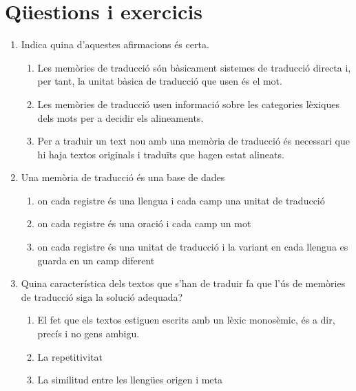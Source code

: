 \section{Qüestions i exercicis}

\begin{enumerate}
\item Indica quina d'aquestes afirmacions és certa.
\begin{enumerate}
\item Les memòries de traducció són bàsicament sistemes de
     traducció directa i, per tant, la unitat bàsica de traducció que
     usen és el mot.
\item Les memòries de traducció usen informació sobre les
     categories lèxiques dels mots per a decidir els alineaments.
\item Per a traduir un text nou amb una memòria de traducció
     és necessari que hi haja textos
     originals i traduïts que hagen estat alineats.
\end{enumerate}

\item Una memòria de traducció és una base de dades 
   
\begin{enumerate}
\item on cada registre és una llengua i cada camp una unitat de
      traducció
\item on cada registre és una oració i cada camp un mot
\item on cada registre és una unitat de traducció i la variant en
      cada llengua es guarda en un camp diferent
\end{enumerate}
\item Quina característica dels textos que s'han de traduir fa que
   l'ús de memòries de traducció siga la solució adequada?
   
\begin{enumerate}
\item El fet que els textos estiguen escrits amb un lèxic
      monosèmic, és a dir, precís i no gens ambigu.
\item La repetitivitat
\item La similitud entre les llengües origen i meta
\end{enumerate}


\end{enumerate}
